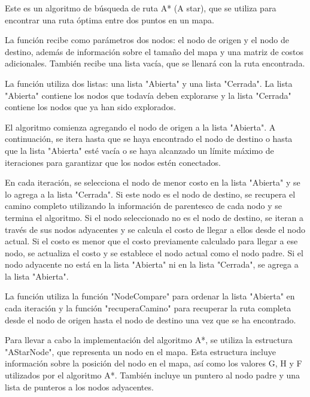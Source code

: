 Este es un algoritmo de búsqueda de ruta A* (A star), que se utiliza para encontrar una ruta óptima entre dos puntos en un mapa.

La función recibe como parámetros dos nodos: el nodo de origen y el nodo de destino, además de información sobre el tamaño del mapa y una matriz de costos adicionales. También recibe una lista vacía, que se llenará con la ruta encontrada.

La función utiliza dos listas: una lista "Abierta" y una lista "Cerrada". La lista "Abierta" contiene los nodos que todavía deben explorarse y la lista "Cerrada" contiene los nodos que ya han sido explorados.

El algoritmo comienza agregando el nodo de origen a la lista "Abierta". A continuación, se itera hasta que se haya encontrado el nodo de destino o hasta que la lista "Abierta" esté vacía o se haya alcanzado un límite máximo de iteraciones para garantizar que los nodos estén conectados.

En cada iteración, se selecciona el nodo de menor costo en la lista "Abierta" y se lo agrega a la lista "Cerrada". Si este nodo es el nodo de destino, se recupera el camino completo utilizando la información de parentesco de cada nodo y se termina el algoritmo. Si el nodo seleccionado no es el nodo de destino, se iteran a través de sus nodos adyacentes y se calcula el costo de llegar a ellos desde el nodo actual. Si el costo es menor que el costo previamente calculado para llegar a ese nodo, se actualiza el costo y se establece el nodo actual como el nodo padre. Si el nodo adyacente no está en la lista "Abierta" ni en la lista "Cerrada", se agrega a la lista "Abierta".

La función utiliza la función "NodeCompare" para ordenar la lista "Abierta" en cada iteración y la función "recuperaCamino" para recuperar la ruta completa desde el nodo de origen hasta el nodo de destino una vez que se ha encontrado.

Para llevar a cabo la implementación del algoritmo A*, se utiliza la estructura "AStarNode", que representa un nodo en el mapa. Esta estructura incluye información sobre la posición del nodo en el mapa, así como los valores G, H y F utilizados por el algoritmo A*. También incluye un puntero al nodo padre y una lista de punteros a los nodos adyacentes.
